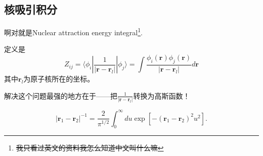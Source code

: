 \documentclass[12pt,a4paper,openany,twoside]{book}
\numberwithin{equation}{section}
\begin{document}
        \subsection{核吸引积分}
          啊对就是Nuclear attraction energy integral\footnote{\sout{我只看过英文的资料我怎么知道中文叫什么嘛}}.

          定义是
          \begin{equation}
              Z_{ij} = \langle \phi_i | \frac{1}{|\boldsymbol{r} - \boldsymbol{r}_l|} |\phi_j \rangle = \int \frac{\phi_i(\boldsymbol{r}) \phi_j(\boldsymbol{r})}{|\boldsymbol{r} - \boldsymbol{r}_l|} d \boldsymbol{r} 
          \end{equation}
          其中$\boldsymbol{r}_l$为原子核所在的坐标。

          解决这个问题最强的地方在于——把$\frac{1}{|\boldsymbol{r} - \boldsymbol{r}_l|}$转换为高斯函数！

          \begin{equation}
              \left|\boldsymbol{r}_{1}-\boldsymbol{r}_{2}\right|^{-1}=\frac{2}{\pi^{1 / 2}} \int_{0}^{\infty} d u \exp \left[-\left(\boldsymbol{r}_{1}-\boldsymbol{r}_{2}\right)^{2} u^{2}\right].
          \end{equation}
\end{document}
